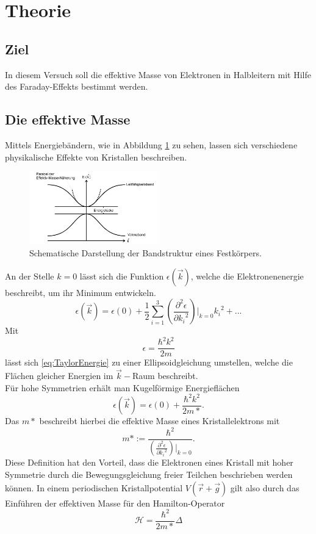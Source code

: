 \section{Theorie}
\label{sec:Theorie}
\subsection{Ziel}
 In diesem Versuch soll die effektive Masse von Elektronen in Halbleitern mit Hilfe des Faraday-Effekts bestimmt werden.
\subsection{Die effektive Masse}
 Mittels Energiebändern, wie in Abbildung \ref{fig:Energiebänder} zu sehen, lassen sich verschiedene physikalische Effekte
 von Kristallen beschreiben.
 \begin{figure}[H]
 \center
 \includegraphics[width=0.5\textwidth]{pics/Energiebaender.jpg}
 \caption{Schematische Darstellung der Bandstruktur eines Festkörpers.\cite{Anleitung}}
 \label{fig:Energiebänder}
 \end{figure}
 An der Stelle $k=0$ lässt sich die Funktion $\epsilon(\vec{k})$, welche die Elektronenenergie beschreibt, um ihr Minimum entwickeln.
 \begin{equation}
   \epsilon(\vec{k})= \epsilon(0)+\frac{1}{2}\sum_{i=1}^3\left(\frac{\partial^2 \epsilon}{\partial{k_i}^2}\right)|_{k=0}{k_i}^2+...
   \label{eq:TaylorEnergie}
 \end{equation}
 Mit
 \begin{equation}
   \epsilon = \frac{\hbar^2 k^2}{2m}
   \label{eq:Epsilonausdruck}
 \end{equation}
 lässt sich \ref{eq:TaylorEnergie} zu einer Ellipsoidgleichung umstellen,
  welche die Flächen gleicher Energien im $\vec{k}-$Raum beschreibt.\\
  Für hohe Symmetrien erhält man Kugelförmige Energieflächen
  \begin{equation}
    \epsilon(\vec{k})= \epsilon(0)+\frac{\hbar^2 k^2}{2m*}.
   \label{eq:KugelEnergie}
  \end{equation}
 Das $m*$ beschreibt hierbei die effektive Masse eines Kristallelektrons mit
 \begin{equation}
   m*:=\frac{\hbar^2}{\left(\frac{\partial^2 \epsilon}{\partial{k_i}^2}\right)|_{k=0}} .
 \end{equation}
 Diese Definition hat den Vorteil, dass die Elektronen eines Kristall mit hoher Symmetrie durch die Bewegungsgleichung
 freier Teilchen beschrieben werden können. In einem periodischen Kristallpotential $V(\vec{r}+\vec{g})$ gilt
  also durch das Einführen der effektiven Masse für den Hamilton-Operator
 \begin{equation}
   \mathcal{H}=\frac{\hbar^2}{2m*}\Delta
   \label{eq:freiHamilton}
 \end{equation}
